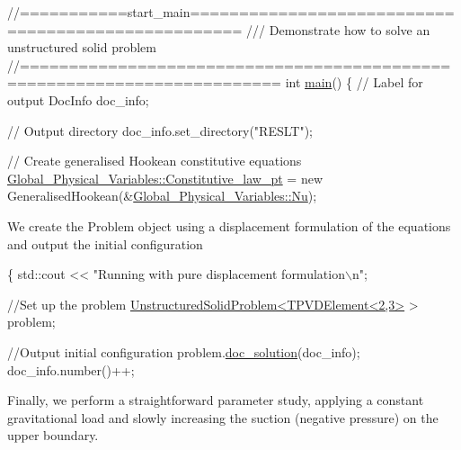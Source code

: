  
\begin{DoxyCodeInclude}
\textcolor{comment}{//===========start\_main===================================================}
\textcolor{comment}{/// Demonstrate how to solve an unstructured solid problem}
\textcolor{comment}{}\textcolor{comment}{//========================================================================}
\textcolor{keywordtype}{int} \hyperlink{unstructured__three__d__solid_8cc_ae66f6b31b5ad750f1fe042a706a4e3d4}{main}()
\{
 \textcolor{comment}{// Label for output}
 DocInfo doc\_info;
 
 \textcolor{comment}{// Output directory}
 doc\_info.set\_directory(\textcolor{stringliteral}{"RESLT"});
 
 \textcolor{comment}{// Create generalised Hookean constitutive equations}
 \hyperlink{namespaceGlobal__Physical__Variables_a5d5f19442938130d36ee7476ae25049c}{Global\_Physical\_Variables::Constitutive\_law\_pt} = 
  \textcolor{keyword}{new} GeneralisedHookean(&\hyperlink{namespaceGlobal__Physical__Variables_a3962c36313826b19f216f6bbbdd6a477}{Global\_Physical\_Variables::Nu});

\end{DoxyCodeInclude}


We create the {\ttfamily Problem} object using a displacement formulation of the equations and output the initial configuration


\begin{DoxyCodeInclude}
 
 \{
  std::cout << \textcolor{stringliteral}{"Running with pure displacement formulation\(\backslash\)n"};

  \textcolor{comment}{//Set up the problem}
  \hyperlink{classUnstructuredSolidProblem}{UnstructuredSolidProblem<TPVDElement<2,3>} > problem;
  
  \textcolor{comment}{//Output initial configuration}
  problem.\hyperlink{classUnstructuredSolidProblem_ab3d66fd61b69d12b4f159d763fc44f15}{doc\_solution}(doc\_info);
  doc\_info.number()++;

\end{DoxyCodeInclude}


Finally, we perform a straightforward parameter study, applying a constant gravitational load and slowly increasing the suction (negative pressure) on the upper boundary.


